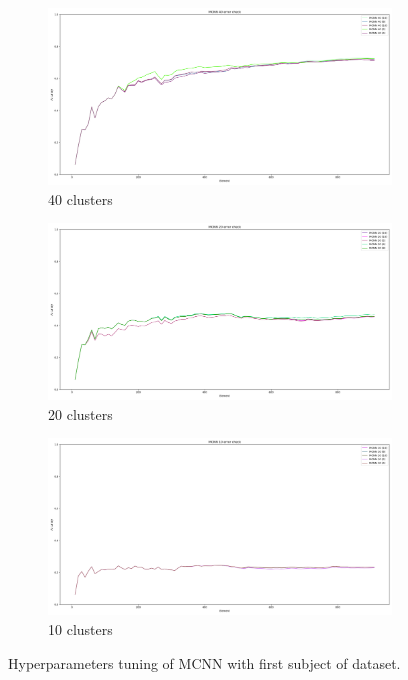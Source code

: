 \begin{figure}
	 \begin{subfigure}[b]{0.49\textwidth}
		 \centering
		 \includegraphics[width=\linewidth]{figures/Banos_S1_shuf_MCNN_40_error_check.png}
		 \caption{40 clusters}
	 \end{subfigure}
	 \begin{subfigure}[b]{0.49\textwidth}
		 \centering
		 \includegraphics[width=\linewidth]{figures/Banos_S1_shuf_MCNN_20_error_check.png}
		 \caption{20 clusters}
	 \end{subfigure}
	 \begin{subfigure}[b]{0.49\textwidth}
		 \centering
		 \includegraphics[width=\linewidth]{figures/Banos_S1_shuf_MCNN_10_error_check.png}
		 \caption{10 clusters}
	 \end{subfigure}
	\caption{Hyperparameters tuning of MCNN with first subject of \banosdataset dataset. }
	\label{fig:mcnn-tuning-error}
\end{figure}

